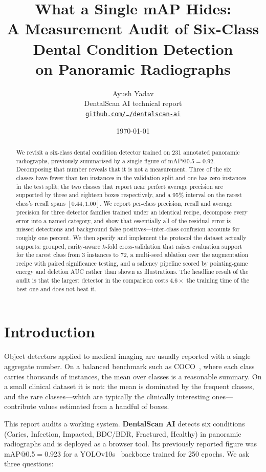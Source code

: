 \documentclass[10pt,twocolumn]{article}
\title{\vspace{-1.6em}\textbf{What a Single mAP Hides:\\A Measurement Audit of
Six-Class Dental Condition Detection\\on Panoramic Radiographs}\vspace{-0.4em}}
\author{Ayush Yadav\\\small DentalScan AI technical report\\
\small\texttt{\href{https://github.com/}{github.com/\ldots/dentalscan-ai}}}
\date{\vspace{-0.8em}\small\today\vspace{-1.2em}}
\newcommand{\clsname}[1]{\textsf{#1}}
\begin{document}
\maketitle

\begin{abstract}
\noindent
We revisit a six-class dental condition detector trained on 231 annotated
panoramic radiographs, previously summarised by a single figure of
mAP@0.5$=$0.92. Decomposing that number reveals that it is not a measurement.
Three of the six classes have fewer than ten instances in the validation split
and one has zero instances in the test split; the two classes that report near
perfect average precision are supported by three and eighteen boxes
respectively, and a 95\% interval on the rarest class's recall spans
$[0.44, 1.00]$. We report per-class precision, recall and average precision for
three detector families trained under an identical recipe, decompose every error
into a named category, and show that essentially all of the residual error is
missed detections and background false positives---inter-class confusion
accounts for roughly one percent. We then specify and implement the protocol the
dataset actually supports: grouped, rarity-aware $k$-fold cross-validation that
raises evaluation support for the rarest class from 3 instances to 72, a
multi-seed ablation over the augmentation recipe with paired significance
testing, and a saliency pipeline scored by pointing-game energy and deletion AUC
rather than shown as illustrations. The headline result of the audit is that the
largest detector in the comparison costs $4.6\times$ the training time of the
best one and does not beat it.
\end{abstract}

\section{Introduction}

Object detectors applied to medical imaging are usually reported with a single
aggregate number. On a balanced benchmark such as COCO~\cite{lin2014coco}, where
each class carries thousands of instances, the mean over classes is a reasonable
summary. On a small clinical dataset it is not: the mean is dominated by the
frequent classes, and the rare classes---which are typically the clinically
interesting ones---contribute values estimated from a handful of boxes.

This report audits a working system. \textbf{DentalScan AI} detects six
conditions (\clsname{Caries}, \clsname{Infection}, \clsname{Impacted},
\clsname{BDC/BDR}, \clsname{Fractured}, \clsname{Healthy}) in panoramic
radiographs and is deployed as a browser tool. Its previously reported figure was
mAP@0.5$=$0.923 for a YOLOv10s~\cite{wang2024yolov10} backbone trained for 250
epochs. We ask three questions:
\end{document}
